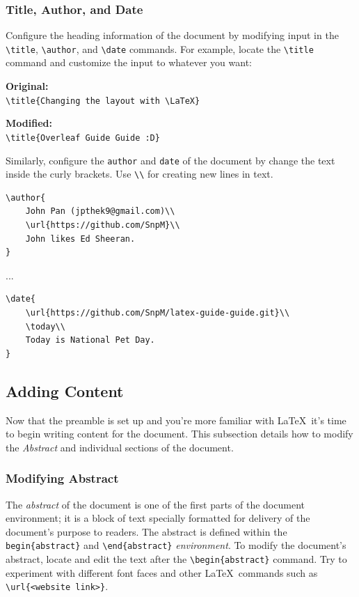     \subsubsection{Title, Author, and Date}
Configure the heading information of the document by modifying input in the \verb|\title|, \verb|\author|, and \verb|\date| commands. For example, locate the \verb|\title| command and customize the input to whatever you want:
\par
\textbf{Original:}\\
\verb|\title{Changing the layout with \LaTeX}|
\par
\textbf{Modified:}\\
\verb|\title{Overleaf Guide Guide :D}|
\par
Similarly, configure the \texttt{author} and \texttt{date} of the document by change the text inside the curly brackets. Use \verb|\\| for creating new lines in text.
\par
\begin{minipage}{\linewidth}
\begin{verbatim}
\author{
    John Pan (jpthek9@gmail.com)\\
    \url{https://github.com/SnpM}\\
    John likes Ed Sheeran.
}
\end{verbatim}
\end{minipage}
\par
...
\par
\begin{minipage}{\linewidth}
\begin{verbatim}
\date{
    \url{https://github.com/SnpM/latex-guide-guide.git}\\
    \today\\
    Today is National Pet Day.
}
\end{verbatim}
\end{minipage}
\par



    
\subsection{Adding Content}
   Now that the preamble is set up and you're more familiar with \LaTeX\, it's time to begin writing content for the document. This subsection details how to modify the \textit{Abstract} and individual sections of the document.
    
    \subsubsection{Modifying Abstract}    
    The \textit{abstract} of the document is one of the first parts of the document environment; it is a block of text specially formatted for delivery of the document's purpose to readers. The abstract is defined within the \verb|begin{abstract}| and \verb|\end{abstract}| \textit{environment}. To modify the document's abstract, locate and edit the text after the \verb|\begin{abstract}| command. Try to experiment with different font faces and other \LaTeX\ commands such as \verb|\url{<website link>}|.
    
